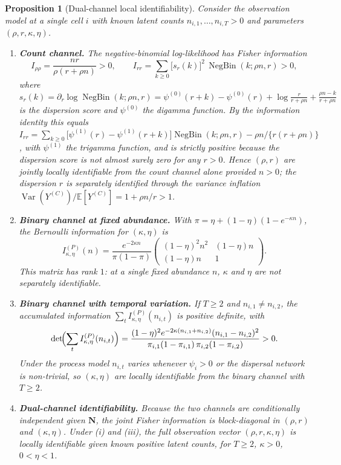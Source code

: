 \documentclass[preprint,12pt]{elsarticle}
\newtheorem{proposition}[theorem]{Proposition}
\theoremstyle{definition}
\newcommand{\E}{\mathbb{E}}
\newcommand{\Var}{\operatorname{Var}}
\newcommand{\NB}{\operatorname{NegBin}}
\begin{document}
\begin{proposition}[Dual-channel local identifiability]
\label{prop:ident}
Consider the observation model at a single cell $i$ with known latent
counts $n_{i,1},\ldots,n_{i,T}>0$ and parameters $(\rho,r,\kappa,\eta)$.
\begin{enumerate}[label=\emph{(\roman*)},leftmargin=2.2em]
  \item \textbf{Count channel.} The negative-binomial log-likelihood has
    Fisher information
    \[
      I_{\rho\rho}=\frac{nr}{\rho(r+\rho n)}>0,
      \qquad
      I_{rr}=\sum_{k\ge0}\bigl[s_r(k)\bigr]^2\,\NB(k;\rho n,r)>0,
    \]
    where
    $s_r(k)=\partial_r\log\NB(k;\rho n,r)
      =\psi^{(0)}(r+k)-\psi^{(0)}(r)+\log\frac{r}{r+\rho n}+\frac{\rho n-k}{r+\rho n}$
    is the dispersion score and $\psi^{(0)}$ the digamma function. By the
    information identity this equals
    $I_{rr}=\sum_{k\ge0}\bigl[\psi^{(1)}(r)-\psi^{(1)}(r+k)\bigr]\NB(k;\rho n,r)
      -\rho n/\{r(r+\rho n)\}$, with $\psi^{(1)}$ the trigamma function, and
    is strictly positive because the dispersion score is not almost surely
    zero for any $r>0$. Hence $(\rho,r)$ are jointly locally identifiable from the
    count channel alone provided
    $n>0$; the dispersion $r$ is separately identified through the variance
    inflation $\Var(Y^{(C)})/\E[Y^{(C)}]=1+\rho n/r>1$.
  \item \textbf{Binary channel at fixed abundance.} With
    $\pi=\eta+(1-\eta)(1-e^{-\kappa n})$, the Bernoulli information for
    $(\kappa,\eta)$ is
    \[
      I^{(P)}_{\kappa,\eta}(n)
      =\frac{e^{-2\kappa n}}{\pi(1-\pi)}
      \begin{pmatrix}
        (1-\eta)^2 n^2 & (1-\eta)n\\[2pt]
        (1-\eta)n & 1
      \end{pmatrix}.
    \]
    This matrix has rank $1$: at a single fixed abundance $n$, $\kappa$ and
    $\eta$ are \emph{not} separately identifiable.
  \item \textbf{Binary channel with temporal variation.} If $T\ge2$ and
    $n_{i,1}\ne n_{i,2}$, the accumulated information
    $\sum_{t}I^{(P)}_{\kappa,\eta}(n_{i,t})$ is positive definite, with
    \[
      \det\!\Bigl(\sum_t I^{(P)}_{\kappa,\eta}(n_{i,t})\Bigr)
      =\frac{(1-\eta)^2 e^{-2\kappa(n_{i,1}+n_{i,2})}(n_{i,1}-n_{i,2})^2}
             {\pi_{i,1}(1-\pi_{i,1})\,\pi_{i,2}(1-\pi_{i,2})}>0 .
    \]
    Under the process model $n_{i,t}$ varies whenever $\psi_i>0$ or the
    dispersal network is non-trivial, so $(\kappa,\eta)$ are locally
    identifiable from the binary channel with $T\ge2$.
  \item \textbf{Dual-channel identifiability.} Because the two channels are
    conditionally independent given $\mathbf{N}$, the joint Fisher
    information is block-diagonal in $(\rho,r)$ and $(\kappa,\eta)$. Under
    \emph{(i)} and \emph{(iii)}, the full observation vector
    $(\rho,r,\kappa,\eta)$ is locally identifiable given known positive
    latent counts, for $T\ge2$, $\kappa>0$, $0<\eta<1$.
\end{enumerate}
\end{proposition}
\end{document}

